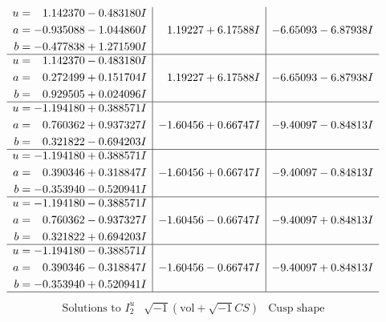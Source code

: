 \documentclass[1p]{elsarticle_modified}
\theoremstyle{definition}
\newcommand{\I}{\sqrt{-1}}
\begin{document}
$$\begin{array}{c|c|c}
\begin{aligned}
u &= \phantom{-}1.142370 - 0.483180 I \\
a &= -0.935088 - 1.044860 I \\
b &= -0.477838 + 1.271590 I\end{aligned}
 & \phantom{-}1.19227 + 6.17588 I & -6.65093 - 6.87938 I \\ \hline\begin{aligned}
u &= \phantom{-}1.142370 - 0.483180 I \\
a &= \phantom{-}0.272499 + 0.151704 I \\
b &= \phantom{-}0.929505 + 0.024096 I\end{aligned}
 & \phantom{-}1.19227 + 6.17588 I & -6.65093 - 6.87938 I \\ \hline\begin{aligned}
u &= -1.194180 + 0.388571 I \\
a &= \phantom{-}0.760362 + 0.937327 I \\
b &= \phantom{-}0.321822 - 0.694203 I\end{aligned}
 & -1.60456 + 0.66747 I & -9.40097 - 0.84813 I \\ \hline\begin{aligned}
u &= -1.194180 + 0.388571 I \\
a &= \phantom{-}0.390346 + 0.318847 I \\
b &= -0.353940 - 0.520941 I\end{aligned}
 & -1.60456 + 0.66747 I & -9.40097 - 0.84813 I \\ \hline\begin{aligned}
u &= -1.194180 - 0.388571 I \\
a &= \phantom{-}0.760362 - 0.937327 I \\
b &= \phantom{-}0.321822 + 0.694203 I\end{aligned}
 & -1.60456 - 0.66747 I & -9.40097 + 0.84813 I \\ \hline\begin{aligned}
u &= -1.194180 - 0.388571 I \\
a &= \phantom{-}0.390346 - 0.318847 I \\
b &= -0.353940 + 0.520941 I\end{aligned}
 & -1.60456 - 0.66747 I & -9.40097 + 0.84813 I\\
 \hline 
 \end{array}$$\newpage$$\begin{array}{c|c|c}  
\text{Solutions to }I^u_{2}& \I (\text{vol} + \sqrt{-1}CS) & \text{Cusp shape}\\
 \hline 
\begin{aligned}

\end{aligned}
\end{array}$$
\end{document}
